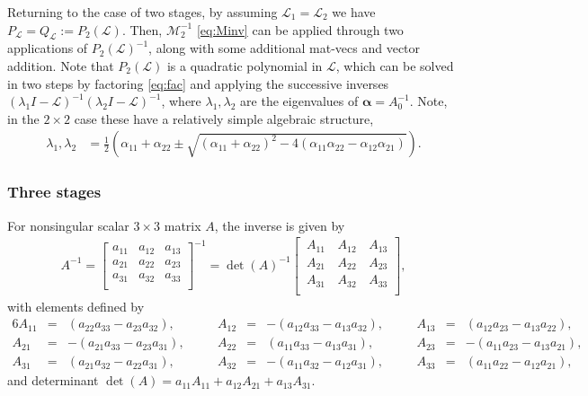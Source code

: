 \documentclass[a4paper,10pt]{article}
\begin{document}
Returning to the case of two stages, by assuming $\mathcal{L}_1 = \mathcal{L}_2$ we have
$P_{\mathcal{L}} = Q_{\mathcal{L}} := P_2(\mathcal{L})$. Then, $\mathcal{M}_2^{-1}$ \eqref{eq:Minv} can
be applied through two applications of $P_2(\mathcal{L})^{-1}$, along with some additional mat-vecs and
vector addition. Note that $P_2(\mathcal{L})$ is a quadratic polynomial in $\mathcal{L}$, which can be
solved in two steps by factoring \eqref{eq:fac} and applying the successive inverses
$(\lambda_1 I - \mathcal{L})^{-1}(\lambda_2 I - \mathcal{L})^{-1}$, where $\lambda_1,\lambda_2$ are
the eigenvalues of $\boldsymbol{\alpha} = A_0^{-1}$. Note, in the $2\times 2$ case these have a
relatively simple algebraic structure, 
%
\begin{align*}
\lambda_1,\lambda_2 & = \frac{1}{2} \left( \alpha_{11} + \alpha_{22} \pm \sqrt{ (\alpha_{11} + \alpha_{22})^2 - 4 ( \alpha_{11}\alpha_{22} - \alpha_{12}\alpha_{21})} \right).
\end{align*}
%



\subsubsection{Three stages}

For nonsingular scalar $3\times 3$ matrix $A$, the inverse is given by 
%
\begin{align}
{A}^{-1} =
\begin{bmatrix}
	a_{11} & a_{12} & a_{13}\\ a_{21} & a_{22} & a_{23} \\ a_{31} & a_{32} & a_{33}\\
\end{bmatrix}^{-1} =
\det({A})^{-1} \begin{bmatrix}
	\, A_{11} & \, A_{12} & \,A_{13} \\ \, A_{21} & \, A_{22} & \,A_{23} \\ \, A_{31} & \,A_{32} & \, A_{33}\\
\end{bmatrix},\label{eq:3inv}
\end{align}
%
with elements defined by
%
\begin{alignat*}{6}
A_{11} &={}&  (a_{22}a_{33} - a_{23}a_{32}), &\quad&
    A_{12} &={}& -(a_{12}a_{33} - a_{13}a_{32}), &\quad&
    A_{13} &={}&  (a_{12}a_{23} - a_{13}a_{22}), \\
A_{21} &={}& -(a_{21}a_{33} - a_{23}a_{31}), &\quad&
    A_{22} &={}&  (a_{11}a_{33} - a_{13}a_{31}), &\quad&
    A_{23} &={}& -(a_{11}a_{23} - a_{13}a_{21}), \\
A_{31} &={}&  (a_{21}a_{32} - a_{22}a_{31}), &\quad&
    A_{32} &={}& -(a_{11}a_{32} - a_{12}a_{31}), &\quad&
    A_{33} &={}&  (a_{11}a_{22} - a_{12}a_{21}),
\end{alignat*}
%
and determinant $\det({A}) = a_{11}A_{11}+a_{12}A_{21}+a_{13}A_{31}$.
\end{document}

